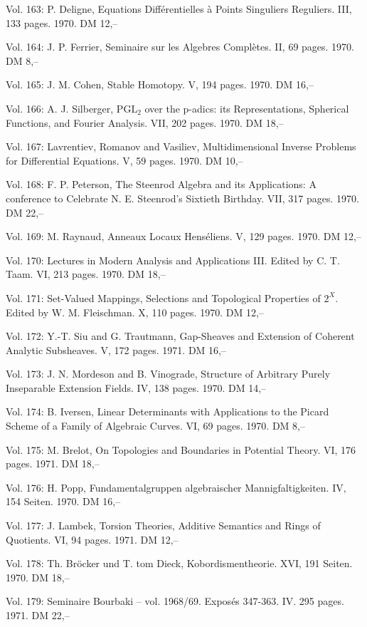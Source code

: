 Vol. 163: P. Deligne, Equations Différentielles à Points Singuliers Reguliers. III, 133 pages. 1970. DM 12,--

Vol. 164: J. P. Ferrier, Seminaire sur les Algebres Complètes. II, 69 pages. 1970. DM 8,--

Vol. 165: J. M. Cohen, Stable Homotopy. V, 194 pages. 1970. DM 16,--

Vol. 166: A. J. Silberger, \(\mathrm{PGL}_2\) over the p-adics: its Representations, Spherical Functions, and Fourier Analysis. VII, 202 pages. 1970. DM 18,--

Vol. 167: Lavrentiev, Romanov and Vasiliev, Multidimensional Inverse Problems for Differential Equations. V, 59 pages. 1970. DM 10,--

Vol. 168: F. P. Peterson, The Steenrod Algebra and its Applications: A conference to Celebrate N. E. Steenrod's Sixtieth Birthday. VII, 317 pages. 1970. DM 22,--

Vol. 169: M. Raynaud, Anneaux Locaux Henséliens. V, 129 pages. 1970. DM 12,--

Vol. 170: Lectures in Modern Analysis and Applications III. Edited by C. T. Taam. VI, 213 pages. 1970. DM 18,--

Vol. 171: Set-Valued Mappings, Selections and Topological Properties of \(2^X\). Edited by W. M. Fleischman. X, 110 pages. 1970. DM 12,--

Vol. 172: Y.-T. Siu and G. Trautmann, Gap-Sheaves and Extension of Coherent Analytic Subsheaves. V, 172 pages. 1971. DM 16,--

Vol. 173: J. N. Mordeson and B. Vinograde, Structure of Arbitrary Purely Inseparable Extension Fields. IV, 138 pages. 1970. DM 14,--

Vol. 174: B. Iversen, Linear Determinants with Applications to the Picard Scheme of a Family of Algebraic Curves. VI, 69 pages. 1970. DM 8,--

Vol. 175: M. Brelot, On Topologies and Boundaries in Potential Theory. VI, 176 pages. 1971. DM 18,--

Vol. 176: H. Popp, Fundamentalgruppen algebraischer Mannigfaltigkeiten. IV, 154 Seiten. 1970. DM 16,--

Vol. 177: J. Lambek, Torsion Theories, Additive Semantics and Rings of Quotients. VI, 94 pages. 1971. DM 12,--

Vol. 178: Th. Bröcker und T. tom Dieck, Kobordismentheorie. XVI, 191 Seiten. 1970. DM 18,--

Vol. 179: Seminaire Bourbaki -- vol. 1968/69. Exposés 347-363. IV. 295 pages. 1971. DM 22,--

